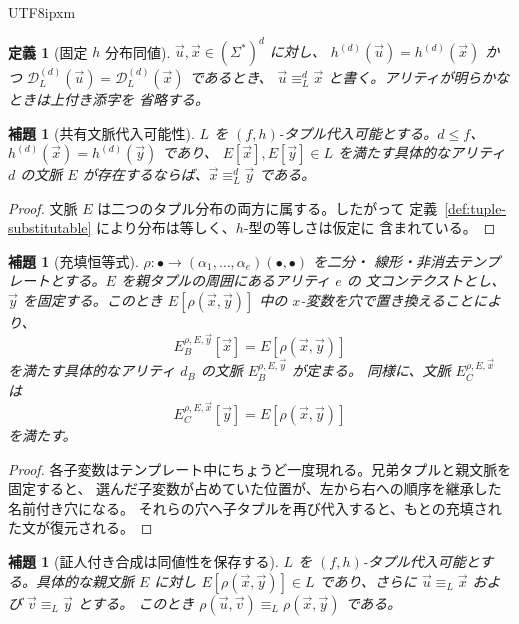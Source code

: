 \documentclass[10pt,a4paper]{article}
\newtheorem{lemma}[theorem]{補題}
\newtheorem{definition}[theorem]{定義}
\theoremstyle{remark}
\newcommand{\D}{\mathcal{D}}
\newcommand{\tuple}[1]{\vec{#1}}
\begin{document}
\begin{CJK}{UTF8}{ipxm}
\begin{definition}[固定 \(h\) 分布同値]
\label{def:distributional-equivalence}
\(\tuple u,\tuple x\in(\Sigma^*)^d\) に対し、
\(h^{(d)}(\tuple u)=h^{(d)}(\tuple x)\) かつ
\(\D_L^{(d)}(\tuple u)=\D_L^{(d)}(\tuple x)\) であるとき、
\(\tuple u\equiv_L^d\tuple x\) と書く。アリティが明らかなときは上付き添字を
省略する。
\end{definition}

\begin{lemma}[共有文脈代入可能性]
\label{lem:shared-context}
\(L\) を \((f,h)\)-タプル代入可能とする。\(d\le f\)、
\(h^{(d)}(\tuple x)=h^{(d)}(\tuple y)\) であり、
\(E[\tuple x],E[\tuple y]\in L\) を満たす具体的なアリティ \(d\) の文脈 \(E\)
が存在するならば、\(\tuple x\equiv_L^d\tuple y\) である。
\end{lemma}

\begin{proof}
文脈 \(E\) は二つのタプル分布の両方に属する。したがって
定義~\ref{def:tuple-substitutable} により分布は等しく、\(h\)-型の等しさは仮定に
含まれている。
\end{proof}

\begin{lemma}[充填恒等式]
\label{lem:filling-identity}
\(\rho\colon\bullet\to(\alpha_1,\ldots,\alpha_e)(\bullet,\bullet)\) を二分・
線形・非消去テンプレートとする。\(E\) を親タプルの周囲にあるアリティ \(e\) の
文コンテクストとし、\(\tuple y\) を固定する。このとき
\(E[\rho(\tuple x,\tuple y)]\) 中の \(x\)-変数を穴で置き換えることにより、
\[
E_B^{\rho,E,\tuple y}[\tuple x]=E[\rho(\tuple x,\tuple y)]
\]
を満たす具体的なアリティ \(d_B\) の文脈 \(E_B^{\rho,E,\tuple y}\) が定まる。
同様に、文脈 \(E_C^{\rho,E,\tuple x}\) は
\[
E_C^{\rho,E,\tuple x}[\tuple y]=E[\rho(\tuple x,\tuple y)]
\]
を満たす。
\end{lemma}

\begin{proof}
各子変数はテンプレート中にちょうど一度現れる。兄弟タプルと親文脈を固定すると、
選んだ子変数が占めていた位置が、左から右への順序を継承した名前付き穴になる。
それらの穴へ子タプルを再び代入すると、もとの充填された文が復元される。
\end{proof}

\begin{lemma}[証人付き合成は同値性を保存する]
\label{lem:witnessed-composition}
\(L\) を \((f,h)\)-タプル代入可能とする。具体的な親文脈 \(E\) に対し
\(E[\rho(\tuple x,\tuple y)]\in L\) であり、さらに
\(\tuple u\equiv_L\tuple x\) および \(\tuple v\equiv_L\tuple y\) とする。
このとき
\(\rho(\tuple u,\tuple v)\equiv_L\rho(\tuple x,\tuple y)\) である。
\end{lemma}


\end{CJK}
\end{document}
